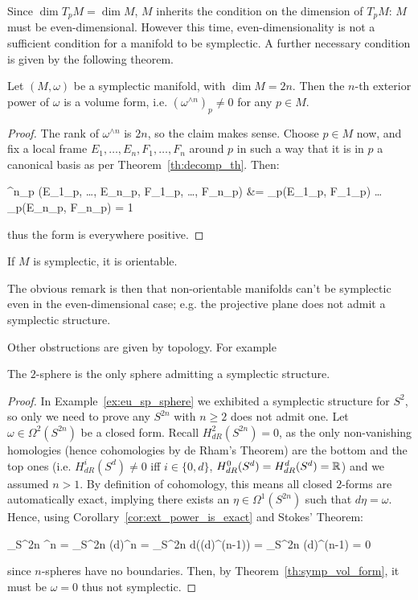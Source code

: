 \documentclass[main.tex]{subfiles}
\begin{document}
Since $\dim T_pM = \dim M$, $M$ inherits the condition on the dimension of $T_pM$: $M$ must be even-dimensional. However this time, even-dimensionality is not a sufficient condition for a manifold to be symplectic. A further necessary condition is given by the following theorem.

\begin{theorem}
\label{th:symp_vol_form}
	Let $(M, \omega)$ be a symplectic manifold, with $\dim M = 2n$. Then the $n$-th exterior power of $\omega$ is a volume form, i.e. $(\omega^{\wedge n})_p \neq 0$ for any $p \in M$.
\end{theorem}
\begin{proof}
	The rank of $\omega^{\wedge n}$ is $2n$, so the claim makes sense. Choose $p \in M$ now, and fix a local frame $E_1, \ldots, E_n, F_1, \ldots, F_n$ around $p$ in such a way that  it is in $p$ a canonical basis as per Theorem~\ref{th:decomp_th}. Then:
	\begin{eqalign}
		\omega^{\wedge n}_p (E_1\vert_p, \ldots, E_n\vert_p, F_1\vert_p, \ldots, F_n\vert_p) &= \omega_p(E_1\vert_p, F_1\vert_p) \cdot \ldots \cdot \omega_p(E_n\vert_p, F_n\vert_p) = 1
	\end{eqalign}
	thus the form is everywhere positive.
\end{proof}
\begin{corollary}
	If $M$ is symplectic, it is orientable.
\end{corollary}

The obvious remark is then that non-orientable manifolds can't be symplectic even in the even-dimensional case; e.g. the projective plane does not admit a symplectic structure.

Other obstructions are given by topology. For example

\begin{theorem}
	The $2$-sphere is the only sphere admitting a symplectic structure.
\end{theorem}
\begin{proof}
	In Example~\ref{ex:eu_sp_sphere} we exhibited a symplectic structure for $S^2$, so only we need to prove any $S^{2n}$ with $n \geq 2$ does not admit one. Let $\omega \in \Omega^2(S^{2n})$ be a closed form. Recall $H^2_{dR}(S^{2n}) = 0$, as the only non-vanishing homologies (hence cohomologies by de Rham's Theorem) are the bottom and the top ones (i.e.  $H^i_{dR}(S^d) \neq 0$ iff $i \in \{0, d\}$, $H^0_{dR}(S^{d}) = H^{d}_{dR}(S^{d}) = \mathbb{R}$) and we assumed $n > 1$. By definition of cohomology, this means all closed $2$-forms are automatically exact, implying there exists an $\eta \in \Omega^1(S^{2n})$ such that $d\eta = \omega$. Hence, using Corollary~\ref{cor:ext_power_is_exact} and Stokes' Theorem:
	\begin{eqalign}
		\int_{S^{2n}} \omega^{\wedge n} = \int_{S^{2n}} (d\eta)^{\wedge n} = \int_{S^{2n}} d(\eta \wedge (d\eta)^{\wedge (n-1)}) = \int_{\partial S^{2n}} \eta \wedge (d\eta)^{\wedge (n-1)} = 0
	\end{eqalign}
	since $n$-spheres have no boundaries. Then, by Theorem~\ref{th:symp_vol_form}, it must be $\omega = 0$ thus not symplectic.
\end{proof}
\end{document}
